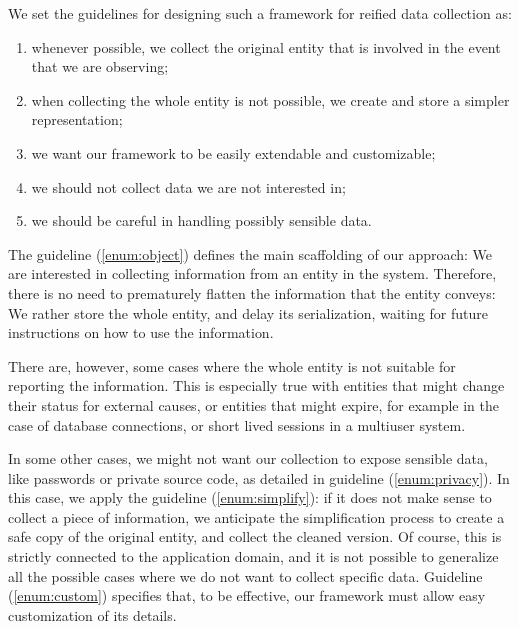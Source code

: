 We set the guidelines for designing such a framework for reified data collection as:

\begin{enumerate}
  \item\label{enum:object} whenever possible, we collect the original entity that is involved in the event that we are observing;
  \item\label{enum:simplify} when collecting the whole entity is not possible, we create and store a simpler representation;
  \item\label{enum:custom} we want our framework to be easily extendable and customizable;
  \item\label{enum:domain-specific} we should not collect data we are not interested in;
  \item\label{enum:privacy} we should be careful in handling possibly sensible data.
\end{enumerate}

The guideline (\ref{enum:object}) defines the main scaffolding of our approach: We are interested in collecting information from an entity in the system.
Therefore, there is no need to prematurely flatten the information that the entity conveys: We rather store the whole entity, and delay its serialization, waiting for future instructions on how to use the information.

There are, however, some cases where the whole entity is not suitable for reporting the information.
This is especially true with entities that might change their status for external causes, or entities that might expire, for example in the case of database connections, or short lived sessions in a multiuser system.

In some other cases, we might not want our collection to expose sensible data, like passwords or private source code, as detailed in guideline (\ref{enum:privacy}).
In this case, we apply the guideline (\ref{enum:simplify}): if it does not make sense to collect a piece of information, we anticipate the simplification process to create a safe copy of the original entity, and collect the cleaned version.
Of course, this is strictly connected to the application domain, and it is not possible to generalize all the possible cases where we do not want to collect specific data.
Guideline (\ref{enum:custom}) specifies that, to be effective, our framework must allow easy customization of its details.


